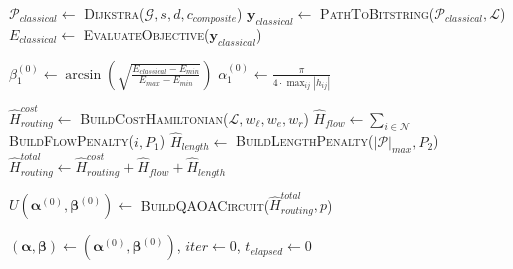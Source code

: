\documentclass[lettersize,journal]{IEEEtran}
\begin{document}
\begin{algorithm}[t]
\scriptsize
\SetAlgoNoEnd
\caption{Warm-Started Quantum Routing}
\label{alg:wsqr}
\BlankLine

\label{line:wr_composite}
\label{line:wr_dijkstra}
$\mathcal{P}_{classical} \leftarrow$ \textsc{Dijkstra}($\mathcal{G}, s, d, c_{composite}$)\;
\label{line:wr_bitstring}
$\mathbf{y}_{classical} \leftarrow$ \textsc{PathToBitstring}($\mathcal{P}_{classical}, \mathcal{L}$) 
\label{line:wr_classical_energy}
$E_{classical} \leftarrow$ \textsc{EvaluateObjective}($\mathbf{y}_{classical}$) 

\label{line:wr_init_beta}
$\beta_1^{(0)} \leftarrow \arcsin\left(\sqrt{\frac{E_{classical} - E_{min}}{E_{max} - E_{min}}}\right)$ 
\label{line:wr_init_alpha}
$\alpha_1^{(0)} \leftarrow \frac{\pi}{4 \cdot \max_{ij}|h_{ij}|}$ 
\label{line:wr_multi_layer}

\label{line:wr_cost_ham}
$\hat{H}_{routing}^{cost} \leftarrow$ \textsc{BuildCostHamiltonian}($\mathcal{L}, w_\ell, w_e, w_r$) 
\label{line:wr_flow_ham}
$\hat{H}_{flow} \leftarrow \sum_{i \in \mathcal{N}}$ \textsc{BuildFlowPenalty}($i, P_1$) 
\label{line:wr_length_ham}
$\hat{H}_{length} \leftarrow$ \textsc{BuildLengthPenalty}($|\mathcal{P}|_{max}, P_2$) 
\label{line:wr_total_ham}
$\hat{H}_{routing}^{total} \leftarrow \hat{H}_{routing}^{cost} + \hat{H}_{flow} + \hat{H}_{length}$\;

\label{line:wr_circuit}
$U(\boldsymbol{\alpha}^{(0)}, \boldsymbol{\beta}^{(0)}) \leftarrow$ \textsc{BuildQAOACircuit}($\hat{H}_{routing}^{total}, p$)\;

\label{line:wr_opt_init}
$(\boldsymbol{\alpha}, \boldsymbol{\beta}) \leftarrow (\boldsymbol{\alpha}^{(0)}, \boldsymbol{\beta}^{(0)})$, $iter \leftarrow 0$, $t_{elapsed} \leftarrow 0$\;
\label{line:wr_loop_start}
\end{algorithm}
\end{document}

